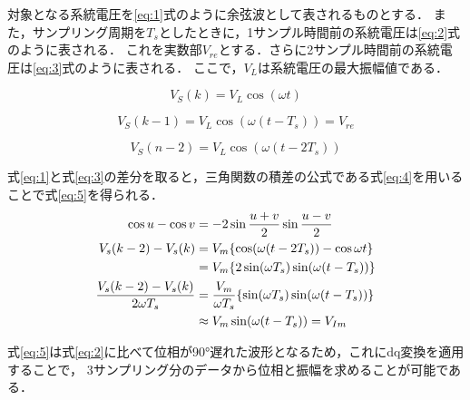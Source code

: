 対象となる系統電圧を\eqref{eq:1}式のように余弦波として表されるものとする．
また，サンプリング周期を$T_s$としたときに，1サンプル時間前の系統電圧は\eqref{eq:2}式のように表される．
これを実数部$V_{re}$とする．さらに2サンプル時間前の系統電圧は\eqref{eq:3}式のように表される．
ここで，$V_{L}$は系統電圧の最大振幅値である．

\begin{equation}
V_S(k) = V_L \cos(\omega t)\label{eq:1} 
\end{equation}

\begin{equation}
V_S(k-1) = V_L \cos(\omega(t-T_s) )=V_{re}\label{eq:2} 
\end{equation}

\begin{equation}
V_S(n-2) = V_L \cos(\omega(t-2T_s))\label{eq:3} 
\end{equation}

式\eqref{eq:1}と式\eqref{eq:3}の差分を取ると，三角関数の積差の公式である式\eqref{eq:4}を用いることで式\eqref{eq:5}を得られる．
\begin{align}
\cos u - \cos v &= -2 \sin \frac{u+v}{2} \sin \frac{u-v}{2} \label{eq:4}  \\
V_s(k-2) - V_s(k) &= V_m \{ \cos(\omega(t-2T_s)) - \cos \omega t \} \notag \\
&= V_m \{ 2 \sin(\omega T_s) \sin(\omega (t-T_s)) \} \notag \\
\frac{V_s(k-2) - V_s(k)}{2\omega T_s} &= \frac{V_m}{\omega T_s} \{ \sin(\omega T_s) \sin(\omega (t-T_s)) \} \notag \\
&\approx V_m \sin(\omega (t-T_s)) = V_{Im} \label{eq:5} 
\end{align}


式\eqref{eq:5}は式\eqref{eq:2}に比べて位相が90°遅れた波形となるため，これにdq変換を適用することで，
3サンプリング分のデータから位相と振幅を求めることが可能である\cite{ref09}\cite{ref10}．

